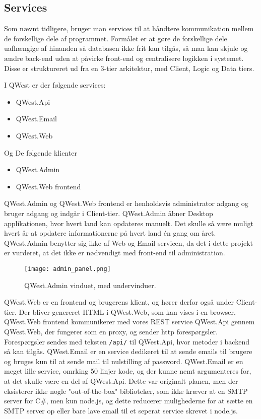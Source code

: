 \subsection{Services}\label{sec:servicesArc}
Som nævnt tidligere, bruger man services til at håndtere kommunikation mellem de forskellige dele af programmet. Formålet er at gøre de forskellige dele uafhængige af hinanden så databasen ikke frit kan tilgås, så man kan skjule og ændre back-end uden at påvirke front-end og centralisere logikken i systemet. Disse er struktureret ud fra en 3-tier arkitektur\cite{3tier}, med Client, Logic og Data tiers.

I QWest er der følgende services:
\begin{itemize}\label{services}
    \item QWest.Api
    \item QWest.Email
    \item QWest.Web
\end{itemize}

Og De følgende klienter
\begin{itemize}\label{services}
    \item QWest.Admin
    \item QWest.Web frontend
\end{itemize}

QWest.Admin og QWest.Web frontend er henholdsvis administrator adgang og bruger adgang og indgår i Client-tier. QWest.Admin åbner Desktop applikationen, hvor hvert land kan opdateres manuelt. Det skulle så være muligt hvert år at opdatere informationerne på hvert land én gang om året. QWest.Admin benytter sig ikke af Web og Email servicen, da det i dette projekt er vurderet, at det ikke er nødvendigt med front-end til administration. 

\begin{figure}
    \texttt{[image: admin\_panel.png]}
    \caption{QWest.Admin vinduet, med undervinduer.}
    \label{fig:admin_panel}
\end{figure}

QWest.Web er en frontend og brugerens klient, og hører derfor også under Client-tier. Der bliver genereret HTML i QWest.Web, som kan vises i en browser. QWest.Web frontend kommunikerer med vores REST service QWest.Api gennem QWest.Web, der fungerer som en proxy, og sender http forespørgsler. Forespørgsler sendes med teksten \texttt{/api/} til QWest.Api, hvor metoder i backend så kan tilgås. QWest.Email er en service dedikeret til at sende emails til brugere og bruges kun til at sende mail til nulstilling af password. QWest.Email er en meget lille service, omrking 50 linjer kode, og der kunne nemt argumenteres for, at det skulle være en del af QWest.Api. Dette var originalt planen, men der eksisterer ikke nogle "out-of-the-box" biblioteker, som ikke kræver at en SMTP server for C\#, men kun node.js, og dette reducerer mulighederne for at sætte en SMTP server op eller bare lave email til et seperat service skrevet i node.js.


